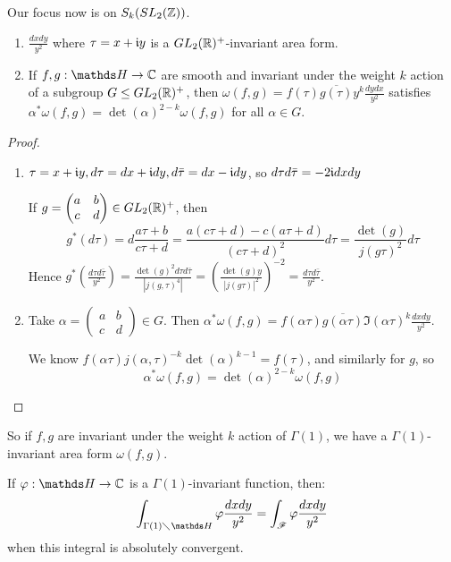 \documentclass[10pt,a4paper]{article}
\begin{document}
Our focus now is on $S_k(SL_2(\mathbb{Z}))$.
\begin{lemma}\hspace*{0cm}
  \begin{enumerate}
    \item $\frac{dxdy}{y^2}$ where $\tau = x+\mathfrak{i} y$ is a $GL_2(\mathbb{R})^+$-invariant area form.
    \item If $f, g: \H \to \C$ are smooth and invariant under the weight $k$ action of a subgroup $G \leq GL_2(\mathbb{R})^+$, then $\omega(f,g) = f(\tau)\overline{g(\tau)}y^k \frac{dydx}{y^2}$ satisfies $\alpha^{\ast}\omega(f,g) = \det(\alpha)^{2-k}\omega(f,g)$ for all $\alpha \in G$.
  \end{enumerate}
\end{lemma}
\begin{proof}\hspace*{0cm}
  \begin{enumerate}
    \item $\tau = x+\mathfrak{i} y, d\tau = dx+\mathfrak{i} dy, d \bar{\tau} = dx-\mathfrak{i} dy$, so $d\tau d\bar{\tau} = -2\mathfrak{i} dxdy$

    If $g = \begin{pmatrix}a&b\\c&d \end{pmatrix} \in GL_2(\mathbb{R})^+$, then
    \[g^\ast (d\tau) = d\frac{a\tau+b}{c\tau+d} = \frac{a(c\tau+d)-c(a\tau+d)}{(c\tau+d)^2}d\tau = \frac{\det(g)}{j(g\tau)^2}d\tau\]
    Hence $g^{\ast}\left(\frac{d\tau d\bar{\tau}}{y^2}\right) = \frac{\det(g)^2 d\tau d\bar{\tau}}{|j(g,\tau)^4|} = \left(\frac{\det(g) y}{|j(g\tau)|^2}\right)^{-2} = \frac{d\tau d\bar{\tau}}{y^2}$.
    \item Take $\alpha = \begin{pmatrix}a&b\\c&d \end{pmatrix} \in G$. Then $\alpha^\ast \omega(f,g) = f(\alpha \tau)\overline{g(\alpha\tau)}\Im(\alpha \tau)^k \frac{dxdy}{y^2}$.

    We know $f(\alpha \tau)j(\alpha, \tau)^{-k}\det(\alpha)^{k-1} = f(\tau)$, and similarly for $g$, so
    \[\alpha^{\ast}\omega(f,g) = \det(\alpha)^{2-k}\omega(f,g)\]
  \end{enumerate}
\end{proof}
So if $f, g$ are invariant under the weight $k$ action of $\Gamma(1)$, we have a $\Gamma(1)$-invariant area form $\omega(f,g)$.
\begin{definition}
  If $\varphi:\H \to \C$ is a $\Gamma(1)$-invariant function, then:
  \[\int_{\Gamma(1)\diagdown \H}\varphi \frac{dxdy}{y^2} = \int_{\mathscr{F}} \varphi \frac{dxdy}{y^2}\]
  when this integral is absolutely convergent.
\end{definition}
\end{document}
